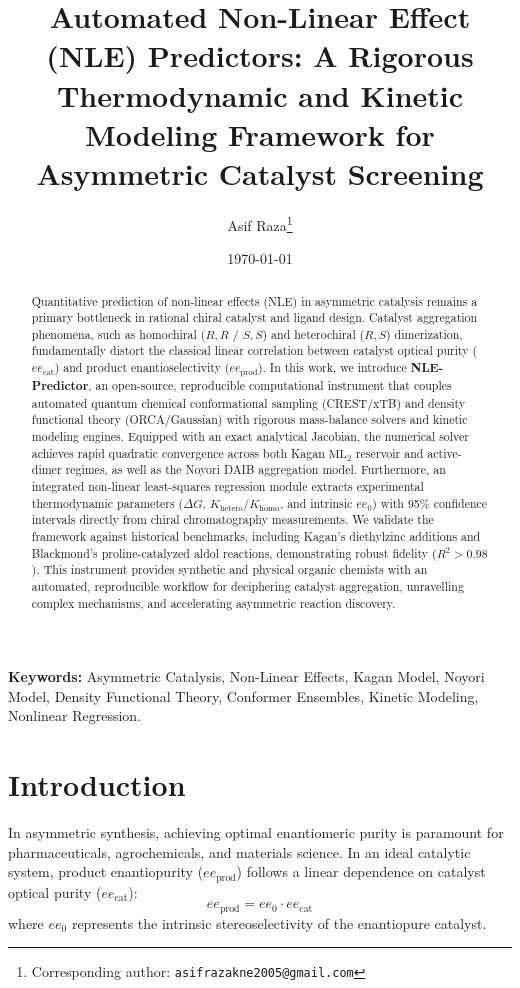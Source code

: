 \documentclass[11pt,a4paper]{article}
\title{\textbf{Automated Non-Linear Effect (NLE) Predictors: A Rigorous Thermodynamic and Kinetic Modeling Framework for Asymmetric Catalyst Screening}}
\author[1]{Asif Raza\thanks{Corresponding author: \texttt{asifrazakne2005@gmail.com}}}
\affil[1]{Department of Chemistry, Jamia Hamdard}
\date{\today}
\begin{document}
\maketitle

\begin{abstract}
Quantitative prediction of non-linear effects (NLE) in asymmetric catalysis remains a primary bottleneck in rational chiral catalyst and ligand design. Catalyst aggregation phenomena, such as homochiral ($R,R$ / $S,S$) and heterochiral ($R,S$) dimerization, fundamentally distort the classical linear correlation between catalyst optical purity ($ee_{\text{cat}}$) and product enantioselectivity ($ee_{\text{prod}}$). In this work, we introduce \textbf{NLE-Predictor}, an open-source, reproducible computational instrument that couples automated quantum chemical conformational sampling (CREST/xTB) and density functional theory (ORCA/Gaussian) with rigorous mass-balance solvers and kinetic modeling engines. Equipped with an exact analytical Jacobian, the numerical solver achieves rapid quadratic convergence across both Kagan $\text{ML}_2$ reservoir and active-dimer regimes, as well as the Noyori DAIB aggregation model. Furthermore, an integrated non-linear least-squares regression module extracts experimental thermodynamic parameters ($\Delta G$, $K_{\text{hetero}}/K_{\text{homo}}$, and intrinsic $ee_0$) with 95\% confidence intervals directly from chiral chromatography measurements. We validate the framework against historical benchmarks, including Kagan's diethylzinc additions and Blackmond's proline-catalyzed aldol reactions, demonstrating robust fidelity ($R^2 > 0.98$). This instrument provides synthetic and physical organic chemists with an automated, reproducible workflow for deciphering catalyst aggregation, unravelling complex mechanisms, and accelerating asymmetric reaction discovery.
\end{abstract}

\textbf{Keywords:} Asymmetric Catalysis, Non-Linear Effects, Kagan Model, Noyori Model, Density Functional Theory, Conformer Ensembles, Kinetic Modeling, Nonlinear Regression.

\section{Introduction}
In asymmetric synthesis, achieving optimal enantiomeric purity is paramount for pharmaceuticals, agrochemicals, and materials science. In an ideal catalytic system, product enantiopurity ($ee_{\text{prod}}$) follows a linear dependence on catalyst optical purity ($ee_{\text{cat}}$):
\begin{equation}
ee_{\text{prod}} = ee_0 \cdot ee_{\text{cat}}
\end{equation}
where $ee_0$ represents the intrinsic stereoselectivity of the enantiopure catalyst.
\end{document}
